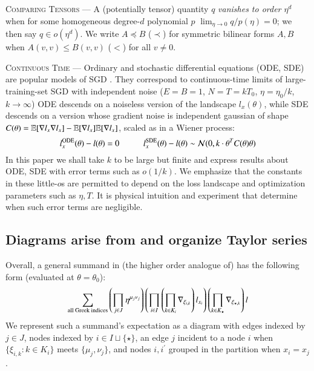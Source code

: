 
            \textsc{Comparing Tensors} --- A (potentially tensor)
            quantity $q$ \emph{vanishes to order $\eta^d$} when
            for some homogeneous degree-$d$ polynomial $p$
            $\lim_{\eta\to 0} q/p(\eta) = 0$; we then say $q\in o(\eta^d)$.
            We write $A \preceq B$ ($\prec$) for symmetric bilinear forms $A,
            B$ when $A(v,v) \leq B(v,v)$ ($<$) for all $v\neq 0$. 

\textsc{Continuous Time} ---
                Ordinary and stochastic differential equations (ODE, SDE) are
                popular models of SGD \citep{li18, ba21}.  They correspond to
                continuous-time limits of large-training-set SGD with
                independent noise ($E=B=1$, $N=T=kT_0$, $\eta=\eta_0/k$, $k\to
                \infty$) ODE descends on a noiseless version of the landscape
                $l_x(\theta)$, while SDE descends on a version whose gradient
                noise is independent gaussian of shape $C(\theta) =
                \mathbb{E}[\nabla l_x \nabla l_x] - \mathbb{E}[\nabla l_x] \mathbb{E}[\nabla
                l_x]$, scaled as in a Wiener process:
                $$
                    l^{\text{ODE}}_x(\theta) - l(\theta) = 0
                    \hspace{1cm}
                    l^{\text{SDE}}_x(\theta) - l(\theta)
                        \sim \mathcal{N}(0, k\cdot \theta^T C(\theta)\theta)
                $$
                In this paper we shall take $k$ to be large but finite and
                express results about ODE, SDE with error terms such as
                $o(1/k)$.  We emphasize that the constants in these little-$o$s
                are permitted to depend on the loss landscape and optimization
                parameters such as $\eta, T$.  It is physical intuition and
                experiment that determine when such error terms are negligible.

\subsection{Diagrams arise from and organize Taylor series}\label{sect:challenges}
  Overall, a general summand in (the higher order analogue of)  has the following form (evaluated at $\theta=\theta_0$):
$$
    \sum_{\text{all Greek indices}} \left(\prod_{j\in J} \eta^{\mu_j\nu_j}\right)
    \left(\prod_{i\in I} \left(\prod_{k\in K_i} \nabla_{\xi_{i,k}}\right)
    l_{x_i}\right) \left(\prod_{k\in K_\star} \nabla_{\xi_{\star,k}}\right)
    l
$$
We represent such a summand's expectation as a diagram with
edges indexed by $j\in J$, nodes
indexed by $i\in I\sqcup \{\star\}$, an edge $j$ incident
to a node $i$ when $\{\xi_{i,k}:k\in K_i\}$ meets
$\{\mu_j,\nu_j\}$, and nodes $i,i^\prime$ grouped in the partition when
$x_i=x_j$.

